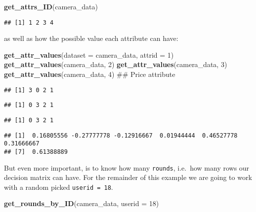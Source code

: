 \documentclass[]{article}
\newenvironment{Shaded}{\begin{snugshade}}{\end{snugshade}}
\newcommand{\KeywordTok}[1]{\textcolor[rgb]{0.13,0.29,0.53}{\textbf{{#1}}}}
\newcommand{\DataTypeTok}[1]{\textcolor[rgb]{0.13,0.29,0.53}{{#1}}}
\newcommand{\DecValTok}[1]{\textcolor[rgb]{0.00,0.00,0.81}{{#1}}}
\newcommand{\NormalTok}[1]{{#1}}
\begin{document}
\begin{Shaded}
\begin{Highlighting}[]
\KeywordTok{get_attrs_ID}\NormalTok{(camera_data)}
\end{Highlighting}
\end{Shaded}

\begin{verbatim}
## [1] 1 2 3 4
\end{verbatim}

as well as how the possible value each attribute can have:

\begin{Shaded}
\begin{Highlighting}[]
\KeywordTok{get_attr_values}\NormalTok{(}\DataTypeTok{dataset =} \NormalTok{camera_data, }\DataTypeTok{attrid =} \DecValTok{1}\NormalTok{)}
\KeywordTok{get_attr_values}\NormalTok{(camera_data, }\DecValTok{2}\NormalTok{)}
\KeywordTok{get_attr_values}\NormalTok{(camera_data, }\DecValTok{3}\NormalTok{)}
\KeywordTok{get_attr_values}\NormalTok{(camera_data, }\DecValTok{4}\NormalTok{) ## Price attribute}
\end{Highlighting}
\end{Shaded}

\begin{verbatim}
## [1] 3 0 2 1
\end{verbatim}

\begin{verbatim}
## [1] 0 3 2 1
\end{verbatim}

\begin{verbatim}
## [1] 0 3 2 1
\end{verbatim}

\begin{verbatim}
## [1]  0.16805556 -0.27777778 -0.12916667  0.01944444  0.46527778  0.31666667
## [7]  0.61388889
\end{verbatim}

But even more important, is to know how many \texttt{rounds}, i.e.~how
many rows our decision matrix can have. For the remainder of this
example we are going to work with a random picked \texttt{userid = 18}.

\begin{Shaded}
\begin{Highlighting}[]
\KeywordTok{get_rounds_by_ID}\NormalTok{(camera_data, }\DataTypeTok{userid =} \DecValTok{18}\NormalTok{)}
\end{Highlighting}
\end{Shaded}
\end{document}
